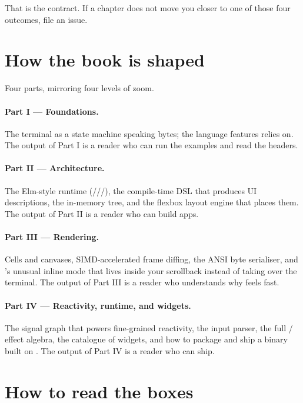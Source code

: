 \documentclass[11pt,openany,oneside]{book}
\begin{document}
That is the contract. If a chapter does not move you closer to one
of those four outcomes, file an issue.

\section*{How the book is shaped}

Four parts, mirroring four levels of zoom.

\paragraph{Part I --- Foundations.} The terminal as a state machine
speaking bytes; the \cpp{} language features \maya{} relies on. The
output of Part I is a reader who can run the examples and read the
headers.

\paragraph{Part II --- Architecture.} The Elm-style runtime
(///), the
compile-time DSL that produces UI descriptions, the in-memory
 tree, and the flexbox layout engine that places
them. The output of Part II is a reader who can build apps.

\paragraph{Part III --- Rendering.} Cells and canvases, SIMD-accelerated
frame diffing, the ANSI byte serialiser, and \maya{}'s unusual inline
mode that lives inside your scrollback instead of taking over the
terminal. The output of Part III is a reader who understands why
\maya{} feels fast.

\paragraph{Part IV --- Reactivity, runtime, and widgets.} The signal
graph that powers fine-grained reactivity, the input parser, the
full / effect algebra, the catalogue of widgets,
and how to package and ship a binary built on \maya{}. The output
of Part IV is a reader who can ship.

\section*{How to read the boxes}
\end{document}
